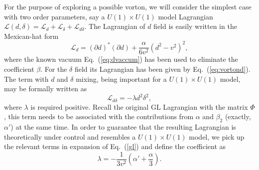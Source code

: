 \documentclass[12pt]{article}
\begin{document}
For the purpose of exploring a possible vorton, we will consider the simplest case
with two order parameters, say a $U(1) \times U(1)$ model Lagrangian
$\mathcal{L}(d,\delta)= \mathcal{L}_d +\mathcal{L}_\delta + \mathcal{L}_{d\delta}$.
The Lagrangian of $d$ field is easily written in the Mexican-hat form
\begin{equation}
  \label{eq:vortonb}
  \mathcal{L}_d  = (\partial d)^* (\partial d) +\frac{\alpha}{6 v^2}(d^2 - v^2)^2,
\end{equation}
where the known vacuum Eq.~(\ref{eq:dvaccum}) has been used to eliminate the coefficient $\beta$.
For the $\delta$ field its Lagrangian has been given by Eq.~(\ref{eq:vortond}).
The term with $d$ and $\delta$ mixing, being important for a $U(1) \times U(1)$ model,  may be
formally written as
\begin{equation}
  \label{eq:vortoninter}
  \mathcal{L}_{d\delta} = -\lambda d^2 \delta^2,
\end{equation}
where $\lambda$ is required positive.
Recall the original GL Lagrangian with the matrix $\Phi$, this term needs to be associated with the contributions from $\alpha$ and $\beta_2$ (exactly, $\alpha'$)
at the same time. In order to guarantee that the resulting Lagrangian is theoretically
under control and resembles a $U(1) \times U(1)$ model, we pick up the relevant terms
in expansion of Eq.~(\ref{gl}) and define the coefficient as
\begin{equation}
  \label{eq:vortoninter1}
  \lambda = -\frac{1}{3 v^2}(\alpha' +\frac{\alpha}{3}).
\end{equation}
\end{document}
